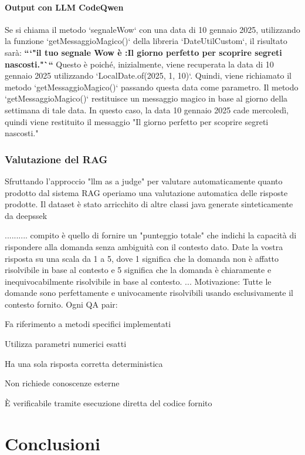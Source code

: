 \documentclass[12pt,a4paper,openright,twoside]{book}
\begin{document}
\subsubsection{Output con LLM CodeQwen}
Se si chiama il metodo `segnaleWow` con una data di 10 gennaio 2025, utilizzando la funzione `getMessaggioMagico()` della libreria `DateUtilCustom`, il risultato sarà:       
\textbf{```"il tuo segnale Wow è :Il giorno perfetto per scoprire segreti nascosti."```}
Questo è poiché, inizialmente, viene recuperata la data di 10 gennaio 2025 utilizzando `LocalDate.of(2025, 1, 10)`. Quindi, viene richiamato il metodo `getMessaggioMagico()` 
passando questa data come parametro.
Il metodo `getMessaggioMagico()` restituisce un messaggio magico in base al giorno della settimana di tale data. In questo caso, la data 10 gennaio 2025 cade mercoledì, quindi viene restituito il messaggio "Il giorno perfetto per scoprire segreti nascosti."

\subsection{Valutazione del RAG}
Sfruttando l'approccio "llm as a judge" per valutare automaticamente quanto prodotto dal sistema RAG
operiamo una valutazione automatica delle risposte prodotte.
Il dataset è stato arricchito di altre classi java generate sinteticamente da deepssek

..........
compito è quello di fornire un "punteggio totale" che indichi la capacità di rispondere alla domanda senza ambiguità con il contesto dato.
Date la vostra risposta su una scala da 1 a 5, dove 1 significa che la domanda non è affatto risolvibile in base al contesto e 5 significa che la domanda è chiaramente e inequivocabilmente risolvibile in base al contesto.
...
Motivazione: Tutte le domande sono perfettamente e univocamente risolvibili usando esclusivamente il contesto fornito. Ogni QA pair:

Fa riferimento a metodi specifici implementati

Utilizza parametri numerici esatti

Ha una sola risposta corretta deterministica

Non richiede conoscenze esterne

È verificabile tramite esecuzione diretta del codice fornito
\chapter{Conclusioni}
\end{document}
